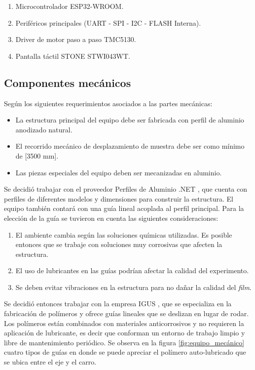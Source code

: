 \begin{enumerate}
\item Microcontrolador ESP32-WROOM. 
\item Periféricos principales (UART - SPI - I2C - FLASH Interna). 
\item Driver de motor paso a paso TMC5130.
\item Pantalla táctil STONE STWI043WT.
\end{enumerate}

\subsection{Componentes mecánicos}

Según los siguientes requerimientos asociados a las partes mecánicas: 

\begin{itemize}
\item La estructura principal del equipo debe ser fabricada con perfil de aluminio anodizado natural.
\item El recorrido mecánico de desplazamiento de muestra debe ser como mínimo de [3500 mm].
\item Las piezas especiales del equipo deben ser mecanizadas en aluminio.

\end{itemize}

Se decidió trabajar con el proveedor Perfiles de Aluminio .NET \citep{web_perfiles_net}, que cuenta con perfiles de diferentes modelos y dimensiones para construir la estructura.
El equipo también contará con una guía lineal acoplada al perfil principal. Para la elección de la guía se tuvieron en cuenta las siguientes consideraciones:

\begin{enumerate}
\item El ambiente cambia  según las soluciones químicas utilizadas. Es posible entonces que se trabaje con soluciones muy corrosivas que afecten la estructura.  
\item El uso de lubricantes en las guías podrían afectar la calidad del experimento.
\item Se deben evitar vibraciones en la estructura para no dañar la calidad del \textit{film}.

\end{enumerate}

Se decidió entonces trabajar con la empresa IGUS \citep{web_igus}, que se especializa en la fabricación de polímeros y ofrece guías lineales que se deslizan en lugar de rodar. Los polímeros están combinados con materiales anticorrosivos y no requieren la aplicación de lubricante, es decir que conforman un entorno de trabajo limpio y libre de mantenimiento periódico. Se observa en la figura \ref{fig:equipo_mecánico} cuatro tipos de guías en donde se puede apreciar el polímero auto-lubricado que se ubica entre el eje y el carro.

